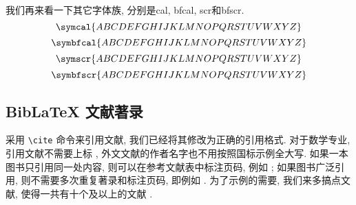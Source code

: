 我们再来看一下其它字体族, 分别是cal, bfcal, scr和bfscr.
\begin{equation}
  \symcal{ABCDEFGHIJKLMNOPQRSTUVWXYZ}
\end{equation}
\begin{equation}
  \symbfcal{ABCDEFGHIJKLMNOPQRSTUVWXYZ}
\end{equation}
\begin{equation}
  \symscr{ABCDEFGHIJKLMNOPQRSTUVWXYZ}
\end{equation}
\begin{equation}
  \symbfscr{ABCDEFGHIJKLMNOPQRSTUVWXYZ}
\end{equation}


\subsection{BibLaTeX 文献著录}\label{sec: exm-bib}

采用 \verb|\cite| 命令来引用文献, 我们已经将其修改为正确的引用格式. 对于数学专业, 引用文献不需要上标 \cite{atiyah_introduction_1969}, 外文文献的作者名字也不用按照国标示例全大写. 如果一本图书只引用同一处内容, 则可以在参考文献表中标注页码, 例如 \cite{herrlich_axiom_2006}; 如果图书广泛引用, 则不需要多次重复著录和标注页码, 即例如 \cite{atiyah_introduction_1969}. 为了示例的需要, 我们来多搞点文献, 使得一共有十个及以上的文献 \cite{jacobson_basic_1985, jacobson_basic_1989, zariski_commutative_1958, zariski_commutative_1960, ciarlet_linear_2013, flaherty_riemannian_1992, munkres_topology_2000, ahlfors_complex_1978, milne_algebraic_2017}.







